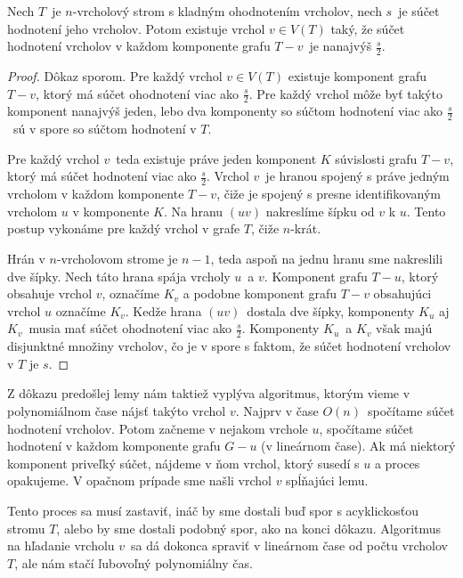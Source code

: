 \begin{lema}
    Nech $T$ je $n$-vrcholový strom s kladným ohodnotením vrcholov, nech $s$ je súčet hodnotení jeho vrcholov.
    Potom existuje vrchol $v \in V(T)$ taký, že súčet hodnotení vrcholov v každom komponente
    grafu $T - v$ je nanajvýš $\frac{s}{2}$.
\end{lema}
\begin{proof}
    Dôkaz sporom. Pre každý vrchol $v \in V(T)$ existuje komponent grafu $T - v$, ktorý
    má súčet ohodnotení viac ako $\frac{s}{2}$. Pre každý vrchol môže byť takýto komponent nanajvýš
    jeden, lebo dva komponenty so súčtom hodnotení viac ako $\frac{s}{2}$ sú v spore so súčtom
    hodnotení v $T$.

    Pre každý vrchol $v$ teda existuje práve jeden komponent $K$ súvislosti grafu
    $T - v$, ktorý má súčet hodnotení viac ako $\frac{s}{2}$. Vrchol $v$ je hranou spojený
    s práve jedným vrcholom v každom komponente $T - v$, čiže je spojený s presne identifikovaným
    vrcholom $u$ v komponente $K$. Na hranu $(uv)$ nakreslíme šípku od $v$ k $u$. Tento postup
    vykonáme pre každý vrchol v grafe $T$, čiže $n$-krát.

    Hrán v $n$-vrcholovom strome je $n-1$, teda aspoň na jednu hranu sme nakreslili dve šípky.
    Nech táto hrana spája vrcholy $u$ a $v$. Komponent grafu $T - u$, ktorý obsahuje vrchol $v$,
    označíme $K_v$ a podobne komponent grafu $T - v$ obsahujúci vrchol $u$ označíme $K_v$. Kedže
    hrana $(uv)$ dostala dve šípky, komponenty $K_u$ aj $K_v$ musia mať súčet ohodnotení viac ako
    $\frac{s}{2}$. Komponenty $K_u$ a $K_v$ však majú disjunktné množiny vrcholov, čo je v spore
    s faktom, že súčet hodnotení vrcholov v $T$ je $s$. \qedhere
\end{proof}

Z dôkazu predošlej lemy nám taktiež vyplýva algoritmus, ktorým vieme v polynomiálnom čase
nájsť takýto vrchol $v$. Najprv v čase $O(n)$ spočítame súčet hodnotení vrcholov. Potom začneme
v nejakom vrchole $u$, spočítame súčet hodnotení v každom komponente grafu $G - u$ (v lineárnom čase).
Ak má niektorý komponent priveľký súčet, nájdeme v ňom vrchol, ktorý susedí s $u$ a proces opakujeme.
V opačnom prípade sme našli vrchol $v$ spĺňajúci lemu.

Tento proces sa musí zastaviť, ináč by sme dostali buď spor s acyklickosťou stromu $T$, alebo by sme
dostali podobný spor, ako na konci dôkazu. Algoritmus na hľadanie vrcholu $v$ sa dá dokonca spraviť
v lineárnom čase od počtu vrcholov $T$, ale nám stačí ľubovoľný polynomiálny čas.


